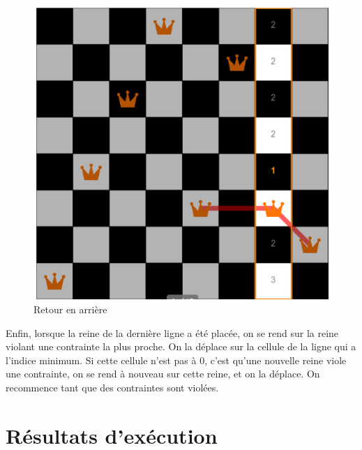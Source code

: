 \documentclass{article}
\begin{document}
\begin{figure}[!h]
	\caption{\label{local3} Retour en arrière}
	\begin{center}
	\includegraphics[scale=0.3]{./picture/local3.png}
	\end{center}
\end{figure}

Enfin, lorsque la reine de la dernière ligne a été placée, on se rend sur la reine violant une contrainte la plus proche. On la déplace sur la cellule de la ligne qui a l'indice minimum. Si cette cellule n'est pas à 0, c'est qu'une nouvelle reine viole une contrainte, on se rend à nouveau sur cette reine, et on la déplace. On recommence tant que des contraintes sont violées. 

\section{Résultats d'exécution}
\end{document}
